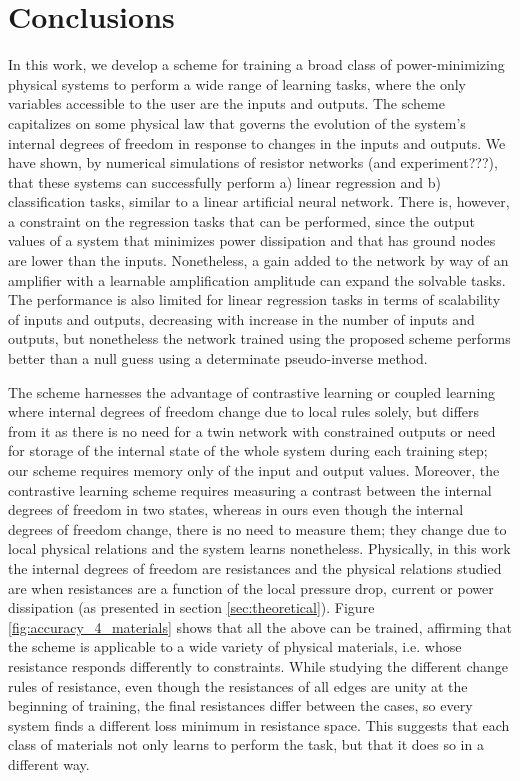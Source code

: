 \documentclass[%
 reprint,
 amsmath,amssymb,
 aps,
]{revtex4-2}
\begin{document}
\section*{Conclusions}\label{sec:conclusions}

    In this work, we develop a scheme for training a broad class of power-minimizing physical systems to perform a wide range of learning tasks, where the only variables accessible to the user are the inputs and outputs. The scheme capitalizes on some physical law that governs the evolution of the system’s internal degrees of freedom in response to changes in the inputs and outputs. 
    We have shown, by numerical simulations of resistor networks \textcolor{roie}{(and experiment???)}, that these systems can successfully perform a) linear regression and b) classification tasks, similar to a linear artificial neural network. There is, however, a constraint on the regression tasks that can be performed, since the output values of a system that minimizes power dissipation and that has ground nodes are lower than the inputs. Nonetheless, a gain added to the network by way of an amplifier with a learnable amplification amplitude can expand the solvable tasks. The performance is also limited for linear regression tasks in terms of scalability of inputs and outputs, decreasing with increase in the number of inputs and outputs, but nonetheless the network trained using the proposed scheme performs better than a null guess using a determinate pseudo-inverse method. 
    
    The scheme harnesses the advantage of contrastive learning \cite{scellier2017equilibrium} or coupled learning \cite{stern2021supervised} where internal degrees of freedom change due to local rules solely, but differs from it as there is no need for a twin network with constrained outputs or need for storage of the internal state of the whole system during each training step; our scheme requires memory only of the input and output values. 
    Moreover, the contrastive learning scheme requires measuring a contrast between the internal degrees of freedom in two states, whereas in ours even though the internal degrees of freedom change, there is no need to measure them; they change due to local physical relations and the system learns nonetheless. 
    Physically, in this work the internal degrees of freedom are resistances and the physical relations studied are when resistances are a function of the local pressure drop, current or power dissipation (as presented in section \ref{sec:theoretical}). 
    Figure \ref{fig:accuracy_4_materials} shows that all the above can be trained, affirming that the scheme is applicable to a wide variety of physical materials, i.e. whose resistance responds differently to constraints. While studying the different change rules of resistance, even though the resistances of all edges are unity at the beginning of training, the final resistances differ between the cases, so every system finds a different loss minimum in resistance space. This suggests that each class of materials not only learns to perform the task, but that it does so in a different way.
\end{document}
